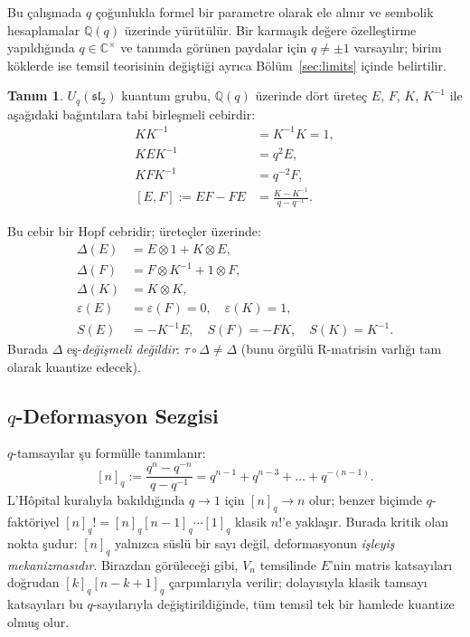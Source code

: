 \documentclass[10pt]{math}
\numberwithin{equation}{section}
\theoremstyle{plain}
\theoremstyle{definition}
\newtheorem{definition}[theorem]{Tanım}
\renewcommand{\sl}{\mathfrak{sl}}
\newcommand{\Uq}{U_q(\sl_2)}
\newcommand{\Q}{\mathbb{Q}}
\newcommand{\C}{\mathbb{C}}
\newcommand{\eps}{\varepsilon}
\newcommand{\cop}{\Delta}
\newcommand{\qint}[1]{[#1]_q}
\newcommand{\qfact}[1]{[#1]_q!}
\begin{document}
Bu çalışmada $q$ çoğunlukla formel bir parametre olarak ele alınır ve sembolik
hesaplamalar $\Q(q)$ üzerinde yürütülür. Bir karmaşık değere özelleştirme
yapıldığında $q\in\C^\times$ ve tanımda görünen paydalar için $q\neq \pm 1$
varsayılır; birim köklerde ise temsil teorisinin değiştiği ayrıca
Bölüm~\ref{sec:limits} içinde belirtilir.

\begin{definition}\label{def:Uq}
$\Uq$ kuantum grubu, $\Q(q)$ üzerinde dört üreteç $E$, $F$, $K$, $K^{-1}$
ile aşağıdaki bağıntılara tabi birleşmeli cebirdir:
\begin{align}
  K K^{-1} &= K^{-1} K = 1, \tag{R1} \\
  K E K^{-1} &= q^{2} E, \tag{R2} \\
  K F K^{-1} &= q^{-2} F, \tag{R3} \\
  [E, F] := EF - FE &= \frac{K - K^{-1}}{q - q^{-1}}. \tag{R4}
\end{align}
\end{definition}

Bu cebir bir Hopf cebridir; üreteçler üzerinde:
\begin{align}
  \cop(E) &= E \otimes 1 + K \otimes E, \\
  \cop(F) &= F \otimes K^{-1} + 1 \otimes F, \\
  \cop(K) &= K \otimes K, \\
  \eps(E) &= \eps(F) = 0, \quad \eps(K) = 1, \\
  S(E) &= -K^{-1} E, \quad S(F) = -F K, \quad S(K) = K^{-1}.
\end{align}
Burada $\cop$ eş-\emph{değişmeli değildir}: $\tau \circ \cop \neq \cop$ (bunu
örgülü R-matrisin varlığı tam olarak kuantize edecek).

\subsection{$q$-Deformasyon Sezgisi}

$q$-tamsayılar şu formülle tanımlanır:
\begin{equation}\label{eq:qint}
  \qint{n} := \frac{q^n - q^{-n}}{q - q^{-1}} = q^{n-1} + q^{n-3} + \dots + q^{-(n-1)}.
\end{equation}
L'H{\^o}pital kuralıyla bakıldığında $q\to 1$ için $\qint{n}\to n$ olur; benzer
biçimde $q$-faktöriyel $\qfact{n} = \qint{n}\qint{n-1}\cdots\qint{1}$ klasik
$n!$'e yaklaşır. Burada kritik olan nokta şudur: $\qint{n}$ yalnızca süslü bir
sayı değil, deformasyonun \emph{işleyiş mekanizmasıdır}. Birazdan görüleceği
gibi, $V_n$ temsilinde $E$'nin matris katsayıları doğrudan
$\qint{k}\qint{n-k+1}$ çarpımlarıyla verilir; dolayısıyla klasik tamsayı
katsayıları bu $q$-sayılarıyla değiştirildiğinde, tüm temsil tek bir hamlede
kuantize olmuş olur.
\end{document}
